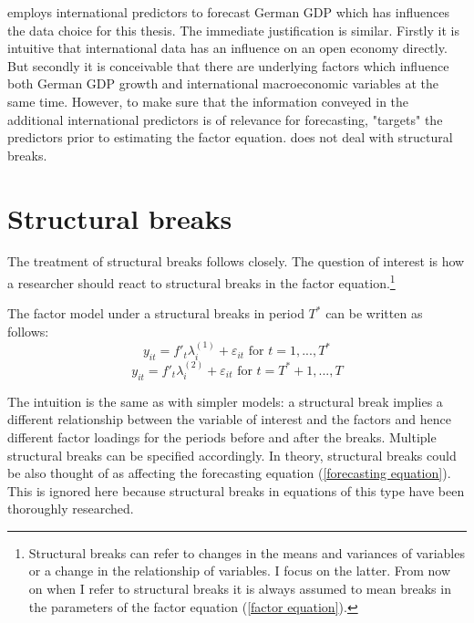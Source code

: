\documentclass[12pt]{article}
\begin{document}
\citet{schumacher2010factor} employs international predictors to forecast German GDP which has influences the data choice for this thesis. The immediate justification is similar. Firstly it is intuitive that international data has an influence on an open economy directly. But secondly it is conceivable that there are underlying factors which influence both German GDP growth and international macroeconomic variables at the same time. However, to make sure that the information conveyed in the additional international predictors is of relevance for forecasting, \citet{schumacher2010factor} "targets" the predictors prior to estimating the factor equation. \citet{schumacher2010factor} does not deal with structural breaks.



\section{Structural breaks}
The treatment of structural breaks follows \citet{breitung2011testing} closely. The question of interest is how a researcher should react to structural breaks in the factor equation.\footnote{Structural breaks can refer to changes in the means and variances of variables or a change in the relationship of variables. I focus on the latter. From now on when I refer to structural breaks it is always assumed to mean breaks in the parameters of the factor equation (\ref{factor equation}).}

The factor model under a structural breaks in period $T^*$ can be written as follows:
\begin{equation}
	\label{}
	y_{it} = f'_t\lambda_i^{(1)} + \varepsilon_{it} \text{ for } t = 1, ..., T^*
\end{equation}
\begin{equation}
	\label{}
	y_{it} = f'_t\lambda_i^{(2)} + \varepsilon_{it} \text{ for } t = T^* + 1, ..., T
\end{equation}

The intuition is the same as with simpler models: a structural break implies a different relationship between the variable of interest and the factors and hence different factor loadings for the periods before and after the breaks. Multiple structural breaks can be specified accordingly. In theory, structural breaks could be also thought of as affecting the forecasting equation (\ref{forecasting equation}). This is ignored here because structural breaks in equations of this type have been thoroughly researched.
\end{document}
